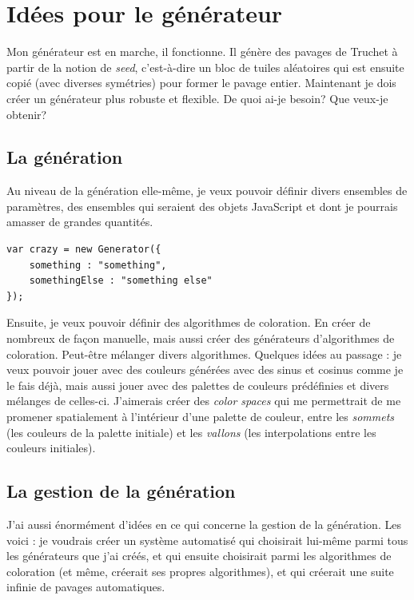 \section{Idées pour le générateur}
Mon générateur est en marche, il fonctionne. Il génère des pavages de Truchet à partir de la notion de \textit{seed}, c'est-à-dire un bloc de tuiles aléatoires qui est ensuite copié (avec diverses symétries) pour former le pavage entier. Maintenant je dois créer un générateur plus robuste et flexible. De quoi ai-je besoin? Que veux-je obtenir?

\subsection{La génération}
Au niveau de la génération elle-même, je veux pouvoir définir divers ensembles de paramètres, des ensembles qui seraient des objets JavaScript et dont je pourrais amasser de grandes quantités.

\begin{lstlisting}
var crazy = new Generator({
    something : "something",
    somethingElse : "something else"
});
\end{lstlisting}

Ensuite, je veux pouvoir définir des algorithmes de coloration. En créer de nombreux de façon manuelle, mais aussi créer des générateurs d'algorithmes de coloration. Peut-être mélanger divers algorithmes. Quelques idées au passage : je veux pouvoir jouer avec des couleurs générées avec des sinus et cosinus comme je le fais déjà, mais aussi jouer avec des palettes de couleurs prédéfinies et divers mélanges de celles-ci. J'aimerais créer des \textit{color spaces} qui me permettrait de me promener spatialement à l'intérieur d'une palette de couleur, entre les \textit{sommets} (les couleurs de la palette initiale) et les \textit{vallons} (les interpolations entre les couleurs initiales).

\subsection{La gestion de la génération}

J'ai aussi énormément d'idées en ce qui concerne la gestion de la génération. Les voici : je voudrais créer un système automatisé qui choisirait lui-même parmi tous les générateurs que j'ai créés, et qui ensuite choisirait parmi les algorithmes de coloration (et même, créerait ses propres algorithmes), et qui créerait une suite infinie de pavages automatiques.

